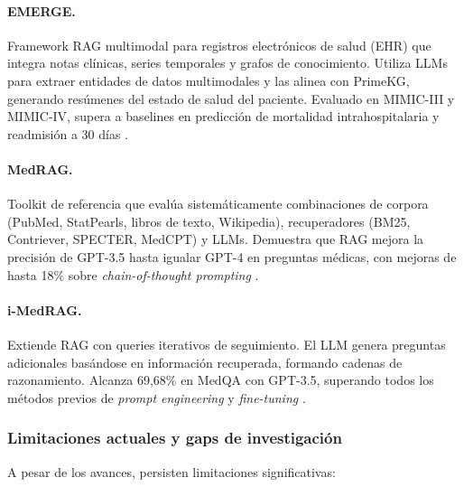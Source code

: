 \paragraph{EMERGE.} Framework \ac{RAG} multimodal para registros electrónicos de salud (\ac{EHR}) que integra notas clínicas, series temporales y grafos de conocimiento. Utiliza \ac{LLM}s para extraer entidades de datos multimodales y las alinea con PrimeKG, generando resúmenes del estado de salud del paciente. Evaluado en \ac{MIMIC}-III y \ac{MIMIC}-IV, supera a baselines en predicción de mortalidad intrahospitalaria y readmisión a 30 días \parencite{zhu2024emerge}.

\paragraph{MedRAG.} Toolkit de referencia que evalúa sistemáticamente combinaciones de corpora (PubMed, StatPearls, libros de texto, Wikipedia), recuperadores (\ac{BM25}, Contriever, SPECTER, MedCPT) y \ac{LLM}s. Demuestra que \ac{RAG} mejora la precisión de \acs{GPT}-3.5 hasta igualar \acs{GPT}-4 en preguntas médicas, con mejoras de hasta 18\% sobre \textit{chain-of-thought prompting} \parencite{xiong2024medrag}.

\paragraph{i-MedRAG.} Extiende \ac{RAG} con queries iterativos de seguimiento. El \ac{LLM} genera preguntas adicionales basándose en información recuperada, formando cadenas de razonamiento. Alcanza 69,68\% en MedQA con \acs{GPT}-3.5, superando todos los métodos previos de \textit{prompt engineering} y \textit{fine-tuning} \parencite{xiong2024imedrag}.

\subsubsection{Limitaciones actuales y gaps de investigación}

A pesar de los avances, persisten limitaciones significativas:

